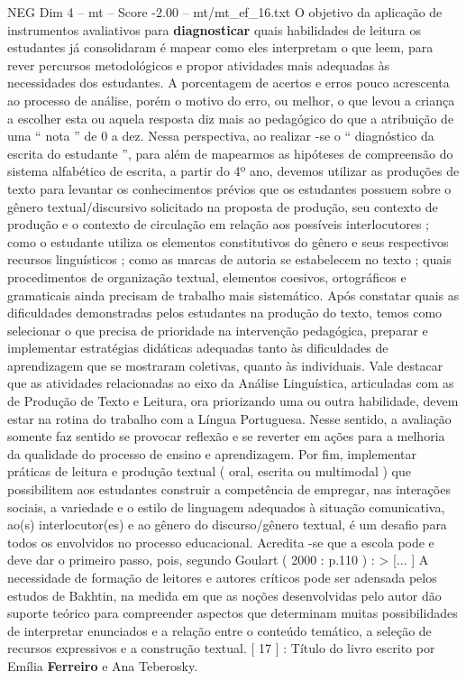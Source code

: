\begin{textsample}{NEG Dim 4 – mt – Score -2.00 – mt/mt\_ef\_16.txt}
O objetivo da aplicação de instrumentos avaliativos para \textbf{diagnosticar} quais habilidades de leitura os estudantes já consolidaram é mapear como eles interpretam o que leem, para rever percursos metodológicos e propor atividades mais adequadas às necessidades dos estudantes.
A porcentagem de acertos e erros pouco acrescenta ao processo de análise, porém o motivo do erro, ou melhor, o que levou a criança a escolher esta ou aquela resposta diz mais ao pedagógico do que a atribuição de uma “ nota ” de 0 a dez.
Nessa perspectiva, ao realizar -se o “ diagnóstico da escrita do estudante ”, para além de mapearmos as hipóteses de compreensão do sistema alfabético de escrita, a partir do 4º ano, devemos utilizar as produções de texto para levantar os conhecimentos prévios que os estudantes possuem sobre o gênero textual/discursivo solicitado na proposta de produção, seu contexto de produção e o contexto de circulação em relação aos possíveis interlocutores ; como o estudante utiliza os elementos constitutivos do gênero e seus respectivos recursos linguísticos ; como as marcas de autoria se estabelecem no texto ; quais procedimentos de organização textual, elementos coesivos, ortográficos e gramaticais ainda precisam de trabalho mais sistemático.
Após constatar quais as dificuldades demonstradas pelos estudantes na produção do texto, temos como selecionar o que precisa de prioridade na intervenção pedagógica, preparar e implementar estratégias didáticas adequadas tanto às dificuldades de aprendizagem que se mostraram coletivas, quanto às individuais.
Vale destacar que as atividades relacionadas ao eixo da Análise Linguística, articuladas com as de Produção de Texto e Leitura, ora priorizando uma ou outra habilidade, devem estar na rotina do trabalho com a Língua Portuguesa.
Nesse sentido, a avaliação somente faz sentido se provocar reflexão e se reverter em ações para a melhoria da qualidade do processo de ensino e aprendizagem.
Por fim, implementar práticas de leitura e produção textual ( oral, escrita ou multimodal ) que possibilitem aos estudantes construir a competência de empregar, nas interações sociais, a variedade e o estilo de linguagem adequados à situação comunicativa, ao(s) interlocutor(es) e ao gênero do discurso/gênero textual, é um desafio para todos os envolvidos no processo educacional.
Acredita -se que a escola pode e deve dar o primeiro passo, pois, segundo Goulart ( 2000 : p.110 ) : > [... ] A necessidade de formação de leitores e autores críticos pode ser adensada pelos estudos de Bakhtin, na medida em que as noções desenvolvidas pelo autor dão suporte teórico para compreender aspectos que determinam muitas possibilidades de interpretar enunciados e a relação entre o conteúdo temático, a seleção de recursos expressivos e a construção textual. [ 17 ] : Título do livro escrito por Emília \textbf{Ferreiro} e Ana Teberosky.

\end{textsample}
